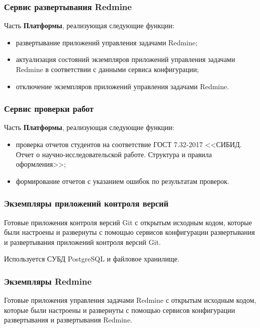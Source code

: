\subsubsection*{Сервис развертывания Redmine}

Часть \textbf{Платформы}, реализующая следующие функции:
\begin{itemize} 
	\item развертывание приложений управления задачами Redmine;
	\item актуализация состояний экземпляров приложений управления задачами Redmine в соответствии с данными сервиса конфигурации;
	\item отключение экземпляров приложений управления задачами Redmine.
\end{itemize}

\subsubsection*{Сервис проверки работ}

Часть \textbf{Платформы}, реализующая следующие функции:
\begin{itemize} 
	\item проверка отчетов студентов на соответствие ГОСТ 7.32-2017 <<СИБИД. Отчет о научно-исследовательской работе. Структура и правила оформления>>;
	\item формирование отчетов с указанием ошибок по результатам проверок.
\end{itemize}

\subsubsection*{Экземпляры приложений контроля версий}

Готовые приложения контроля версий Git с открытым исходным кодом, которые были настроены и развернуты с помощью сервисов конфигурации развертывания и развертывания приложений контроля версий Git.

Используется СУБД PostgreSQL и файловое хранилище.

\subsubsection*{Экземпляры Redmine}

Готовые приложения управления задачами Redmine с открытым исходным кодом, которые были настроены и развернуты с помощью сервисов конфигурации развертывания и развертывания Redmine.

